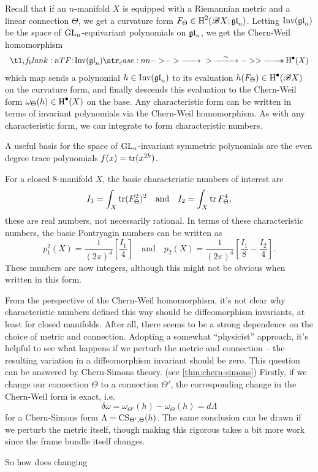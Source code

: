 Recall that if an $n$-manifold $X$ is equipped with a Riemannian metric and a linear connection $\Theta$, we get a curvature form $F_\Theta\in \operatorname{H}^2(\mathscr{B} X; \mathfrak{gl}_n)$. Letting $\operatorname{\operatorname{Inv}}(\mathfrak{gl}_n)$ be the space of ${\operatorname{GL}}_n$-equivariant polynomials on $\mathfrak{gl}_n$, we get the Chern-Weil homomorphism
\[
  \lkxfunc{}{\Inv(\gl_n)}{\H^\bullet(X)}
\]
which map sends a polynomial $h\in \operatorname{\operatorname{Inv}}(\mathfrak{gl}_n)$ to its evaluation $h(F_\Theta)\in \operatorname{H}^\bullet(\mathscr{B} X)$ on the curvature form, and finally descends this evaluation to the Chern-Weil form $\omega_\Theta(h) \in \operatorname{H}^\bullet(X)$ on the base. Any characteristic form can be written in terms of invariant polynomials via the Chern-Weil homomorphism. As with any characteristic form, we can integrate to form characteristic numbers.

\begin{note*}
A useful basis for the space of ${\operatorname{GL}}_n$-invariant symmetric polynomials are the even degree trace polynomials $f(x)=\operatorname{\operatorname{tr}}(x^{2k})$. 
\end{note*}

\begin{example}\label{exam:chern-weil_8-manifold}
  For a closed $8$-manifold $X$, the basic characteristic numbers of interest are
  \[
    I_1 = \int_X \operatorname{\operatorname{tr}} (F_\Theta^2)^2
    \quad\textrm{and}\quad
    I_2 = \int_X \operatorname{\operatorname{tr}} F_\Theta^4,
  \]
  these are real numbers, not necessarily rational. In terms of these characteristic numbers, the basic Pontryagin numbers can be written as
  \[
    p_1^2(X) = \frac{1}{(2\pi)^4} \left[\frac{I_1}{4}\right]
    \quad\textrm{and}\quad
    p_2(X) = \frac{1}{(2\pi)^4}\left[\frac{I_1}{8} - \frac{I_2}{4}\right].
  \]
  These numbers are now integers, although this might not be obvious when written in this form.
\end{example}

From the perspective of the Chern-Weil homomorphism, it's not clear why
characteristic numbers defined this way should be diffeomorphism invariants, at least for closed manifolds. After all, there seems to be a strong dependence on the choice of metric and connection.
Adopting a somewhat ``physicist'' approach, it's helpful to see what happens if we perturb the metric and connection -- the resulting variation in a diffeomorphism invariant should be zero.
This question can be answered by Chern-Simons theory. (see \cref{thm:chern-simons}) Firstly, if we change our connection $\Theta$ to a connection $\Theta'$, the corresponding change in the Chern-Weil form is exact, i.e. 
\[
  \delta \omega = \omega_{\Theta'}(h) - \omega_{\Theta}(h) = d\Lambda
\]
for a Chern-Simons form $\Lambda = {\operatorname{CS}}_{\Theta',\Theta}(h)$. The same conclusion can be drawn if we perturb the metric itself, though making this rigorous takes a bit more work since the frame bundle itself changes.
\begin{remark}
\end{remark}
So how does changing 

